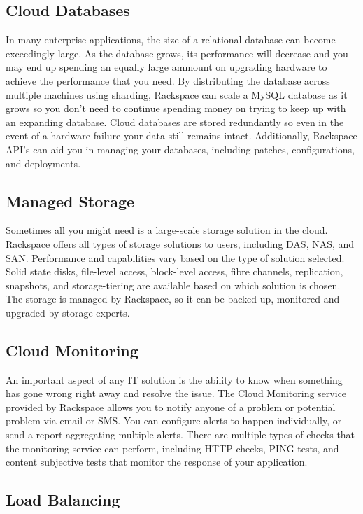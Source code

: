 \documentclass[DIV=calc, paper=letter, fontsize=12pt, twocolumn]{scrartcl}	 %
\begin{document}
\subsection*{Cloud Databases}

In many enterprise applications, the size of a relational database can
become exceedingly large. As the database grows, its performance will 
decrease and you may end up spending an equally large ammount on upgrading
hardware to achieve the performance that you need. By distributing the
database across multiple machines using sharding, Rackspace can scale
a MySQL database as it grows so you don't need to continue spending 
money on trying to keep up with an expanding database. Cloud databases
are stored redundantly so even in the event of a hardware failure 
your data still remains intact. Additionally, Rackspace API's can aid
you in managing your databases, including patches, configurations, 
and deployments.

\subsection*{Managed Storage}

Sometimes all you might need is a large-scale storage solution in the 
cloud. Rackspace offers all types of storage solutions to users, 
including DAS, NAS, and SAN. Performance and capabilities vary
based on the type of solution selected. Solid state disks, file-level
access, block-level access, fibre channels, replication, snapshots,
and storage-tiering are available based on which solution is chosen.
The storage is managed by Rackspace, so it can be backed up, monitored
and upgraded by storage experts.

\subsection*{Cloud Monitoring}

An important aspect of any IT solution is the ability to know when
something has gone wrong right away and resolve the issue. The Cloud
Monitoring service provided by Rackspace allows you to notify anyone
of a problem or potential problem via email or SMS. You can configure
alerts to happen individually, or send a report aggregating multiple
alerts. There are multiple types of checks that the monitoring service
can perform, including HTTP checks, PING tests, and content subjective
tests that monitor the response of your application.

\subsection*{Load Balancing}
\end{document}
